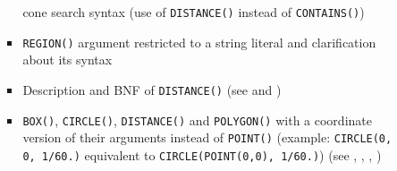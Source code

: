 \documentclass[11pt,a4paper]{ivoa}
\begin{document}
\begin{itemize}
\begin{itemize}
\begin{itemize}
                          cone search syntax (use
                          of \verb:DISTANCE(): instead of \verb:CONTAINS():)
                    \item \verb:REGION(): argument restricted to a string
                          literal and clarification about its syntax
                    \item Description and BNF of \verb:DISTANCE():
                          (see  and
                          )
                    \item \verb:BOX():, \verb:CIRCLE():, \verb:DISTANCE(): and
                          \verb:POLYGON(): with a coordinate version of their
                          arguments instead of \verb:POINT(): (example:
                          \verb:CIRCLE(0, 0, 1/60.): equivalent to
                          \verb:CIRCLE(POINT(0,0), 1/60.):)
                          (see ,
                          ,
                          ,
                          )
                \end{itemize}
        \end{itemize}
\end{itemize}

\clearpage %

\end{document}
